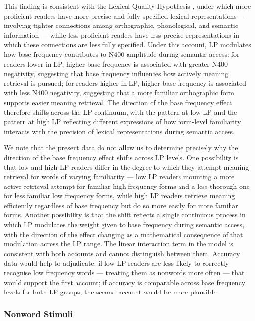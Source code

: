 \documentclass[utf8]{FrontiersinHarvard} %
\begin{document}
	This finding is consistent with the Lexical Quality Hypothesis \citep{perfettiReadingAbilityLexical2007}, under which more proficient readers have more precise and fully specified lexical representations --- involving tighter connections among orthographic, phonological, and semantic information --- while less proficient readers have less precise representations in which these connections are less fully specified. Under this account, LP modulates how base frequency contributes to N400 amplitude during semantic access: for readers lower in LP, higher base frequency is associated with greater N400 negativity, suggesting that base frequency influences how actively meaning retrieval is pursued; for readers higher in LP, higher base frequency is associated with less N400 negativity, suggesting that a more familiar orthographic form supports easier meaning retrieval. The direction of the base frequency effect therefore shifts across the LP continuum, with the pattern at low LP and the pattern at high LP reflecting different expressions of how form-level familiarity interacts with the precision of lexical representations during semantic access.
	
	We note that the present data do not allow us to determine precisely why the direction of the base frequency effect shifts across LP levels. One possibility is that low and high LP readers differ in the degree to which they attempt meaning retrieval for words of varying familiarity --- low LP readers mounting a more active retrieval attempt for familiar high frequency forms and a less thorough one for less familiar low frequency forms, while high LP readers retrieve meaning efficiently regardless of base frequency but do so more easily for more familiar forms. Another possibility is that the shift reflects a single continuous process in which LP modulates the weight given to base frequency during semantic access, with the direction of the effect changing as a mathematical consequence of that modulation across the LP range. The linear interaction term in the model is consistent with both accounts and cannot distinguish between them. Accuracy data would help to adjudicate: if low LP readers are less likely to correctly recognise low frequency words --- treating them as nonwords more often --- that would support the first account; if accuracy is comparable across base frequency levels for both LP groups, the second account would be more plausible.
	
	
	\subsubsection{Nonword Stimuli}
	
\end{document}
